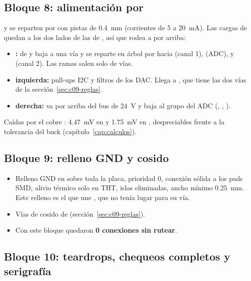 \subsection{Bloque 8: alimentación por }

 y  se reparten por  con pistas de \SI{0.4}{\milli\meter} (corrientes de 5 a
\SI{20}{\milli\ampere}). Las cargas de  quedan a los dos lados de las de , así que  rodea a
 por arriba:
\begin{itemize}
  \item \textbf{:} de  y  baja a una vía y se reparte en árbol por  hacia
   (canal 1),  (ADC),  y  (canal 2). Las ramas salen solo de vías.
  \item \textbf{ izquierda:} pull-ups I2C y filtros de los DAC. Llega a , que tiene las dos vías de la
  sección~\ref{sec:c09-reglas}.
  \item \textbf{ derecha:} va por arriba del bus de \SI{24}{\volt} y baja al grupo del ADC (,
  , ).
\end{itemize}
Caídas por el cobre \medido: \SI{4.47}{\milli\volt} en  y \SI{1.75}{\milli\volt} en , despreciables
frente a la tolerancia del buck (capítulo~\ref{cap:calculos}).

\subsection{Bloque 9: relleno GND y cosido}

\begin{itemize}
  \item Relleno GND en  sobre toda la placa, prioridad 0, conexión sólida a los pads SMD, alivio térmico solo
  en THT, islas eliminadas, ancho mínimo \SI{0.25}{\milli\meter}. Este relleno es el que une , que no tenía
  lugar para su vía.
  \item Vías de cosido de  (sección~\ref{sec:c09-reglas}).
  \item Con este bloque quedaron \textbf{0 conexiones sin rutear}.
\end{itemize}

\subsection{Bloque 10: teardrops, chequeos completos y serigrafía}

